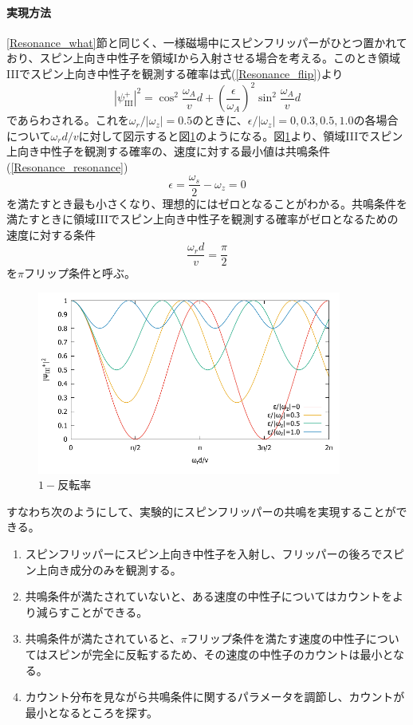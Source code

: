 \paragraph{実現方法}
\ref{Resonance_what}節と同じく、一様磁場中にスピンフリッパーがひとつ置かれており、スピン上向き中性子を領域Iから入射させる場合を考える。このとき領域IIIでスピン上向き中性子を観測する確率は式(\ref{Resonance_flip})より
\begin{equation}
|\psi_\mathrm{III}^+|^2 =\cos^2 \frac{\omega_A}{v}d+\left(\frac{\epsilon}{\omega_A}\right)^2\sin^2\frac{\omega_A}{v}d
\end{equation}
であらわされる。これを$\omega_r/|\omega_z|=0.5$のときに、$\epsilon/|\omega_z|=0,0.3,0.5,1.0$の各場合について$\omega_r d/v$に対して図示すると図\ref{Resonance_fig_1-reversal}のようになる。図\ref{Resonance_fig_1-reversal}より、領域IIIでスピン上向き中性子を観測する確率の、速度に対する最小値は共鳴条件(\ref{Resonance_resonance})
\[
\epsilon=\frac{\omega_s}{2}-\omega_z=0
\]
を満たすとき最も小さくなり、理想的にはゼロとなることがわかる。共鳴条件を満たすときに領域IIIでスピン上向き中性子を観測する確率がゼロとなるための速度に対する条件
\begin{equation}
\frac{\omega_rd}{v}=\frac{\pi}{2}
\end{equation}
を$\pi$フリップ条件と呼ぶ。
\begin{figure}[h]
\begin{center}
\includegraphics[width=10cm]{resonance/whatwhyhow/resonance_1-reversal.pdf}
\caption{$1-反転率$}
\label{Resonance_fig_1-reversal}
\end{center}
\end{figure}

すなわち次のようにして、実験的にスピンフリッパーの共鳴を実現することができる。
\begin{enumerate}
\item スピンフリッパーにスピン上向き中性子を入射し、フリッパーの後ろでスピン上向き成分のみを観測する。
\item 共鳴条件が満たされていないと、ある速度の中性子についてはカウントをより減らすことができる。
\item 共鳴条件が満たされていると、$\pi$フリップ条件を満たす速度の中性子についてはスピンが完全に反転するため、その速度の中性子のカウントは最小となる。
\item カウント分布を見ながら共鳴条件に関するパラメータを調節し、カウントが最小となるところを探す。
\end{enumerate}


